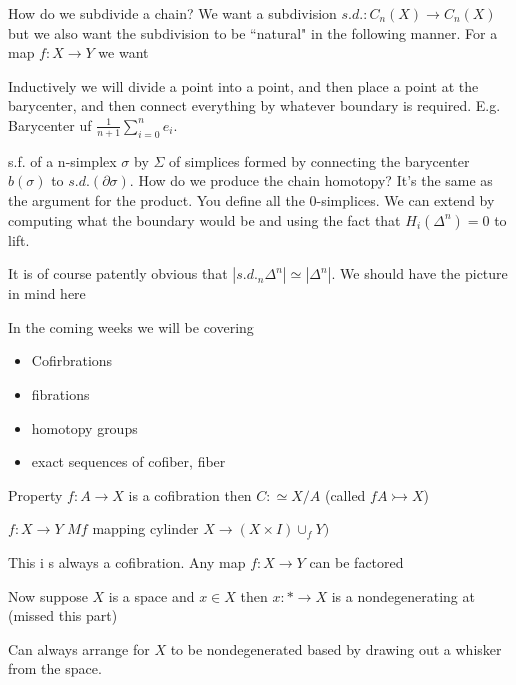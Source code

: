 \documentclass[12pt]{article}
\theoremstyle{definition}
\begin{document}
	How do we subdivide a chain? We want a subdivision $s.d.:C_n(X)\to C_n(X)$ but we also want the subdivision to be ``natural" in the following manner. For a map $f:X\to Y$ we want \begin{center}
	\end{center}
	Inductively we will divide a point into a point, and then place a point at the barycenter, and then connect everything by whatever boundary is required. E.g. Barycenter uf $\frac{1}{n+1}\sum_{i=0}^n e_i$. 
	
	s.f. of a n-simplex $\sigma$ by $\Sigma$ of  simplices formed by connecting the barycenter $b(\sigma)$ to $s.d.(\partial \sigma)$. How do we produce the chain homotopy? It's the same as the argument for the product. You define all the $0$-simplices. We can extend by computing what the boundary would be and using the fact that $H_i(\Delta^n)=0$ to lift. 
	
	
	It is of course patently obvious that $|s.d._n\Delta^n|\simeq |\Delta^n|$. We should have the picture in mind here
	
	
	In the coming weeks we will be covering \begin{itemize}
		\item Cofirbrations
		\item fibrations
		\item homotopy groups
		\item exact sequences of cofiber, fiber
	\end{itemize}
	Property $f:A\to X$ is a cofibration then $C:\simeq X/A$ (called $f A\rightarrowtail X$)
	
	$f:X\to Y$ $Mf$ mapping cylinder $X\to (X\times I) \cup_f Y)$
	
	This i s always a cofibration.  Any map $f:X\to Y$ can be factored \begin{center}
	\end{center}
	Now suppose $X$ is a space and $x\in X$ then $x:\ast\to X$ is a nondegenerating at (missed this part)
	
	Can always arrange for $X$ to be nondegenerated based by drawing out a whisker from the space.
	
\end{document}
